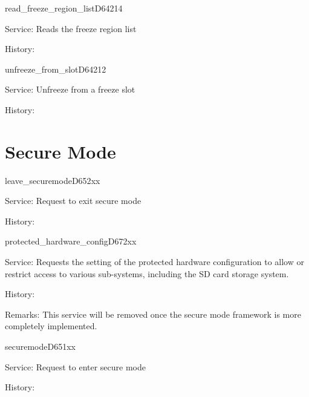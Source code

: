 \begin{hyppotrap}{read\_freeze\_region\_list}{D642}{14}
\item [Service:]
  Reads the freeze region list
\item [History:]
\end{hyppotrap}


\begin{hyppotrap}{unfreeze\_from\_slot}{D642}{12}
\item [Service:]
  Unfreeze from a freeze slot
\item [History:]
\end{hyppotrap}



\newpage
\section{Secure Mode}


\begin{hyppotrap}{leave\_securemode}{D652}{xx}
\item [Service:]
  Request to exit secure mode
\item [History:]
\end{hyppotrap}


\begin{hyppotrap}{protected\_hardware\_config}{D672}{xx}
\item [Service:]
  Requests the setting of the protected hardware configuration to allow or
  restrict access to various sub-systems, including the SD card storage system.
\item [History:]
\item [Remarks:]
  This service will be removed once the secure mode framework is more
  completely implemented.
\end{hyppotrap}


\begin{hyppotrap}{securemode}{D651}{xx}
\item [Service:]
  Request to enter secure mode
\item [History:]
\end{hyppotrap}
